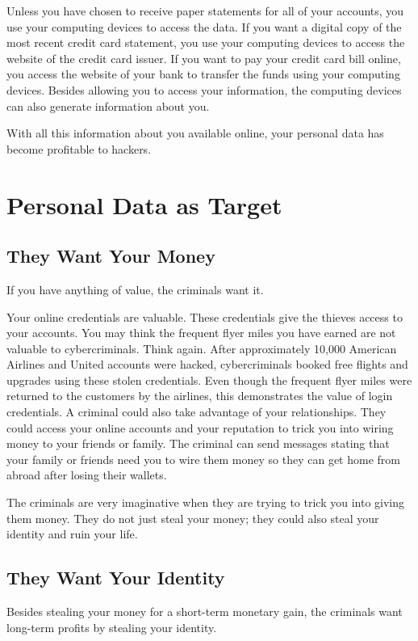 \documentclass{article}
\begin{document}
Unless you have chosen to receive paper statements for all of your accounts, you use your computing devices to access the data. If you want a digital copy of the most recent credit card statement, you use your computing devices to access the website of the credit card issuer. If you want to pay your credit card bill online, you access the website of your bank to transfer the funds using your computing devices. Besides allowing you to access your information, the computing devices can also generate information about you.

With all this information about you available online, your personal data has become profitable to hackers.
\section{Personal Data as Target}
\subsection{They Want Your Money}



If you have anything of value, the criminals want it.

Your online credentials are valuable. These credentials give the thieves access to your accounts. You may think the frequent flyer miles you have earned are not valuable to cybercriminals. Think again. After approximately 10,000 American Airlines and United accounts were hacked, cybercriminals booked free flights and upgrades using these stolen credentials. Even though the frequent flyer miles were returned to the customers by the airlines, this demonstrates the value of login credentials. A criminal could also take advantage of your relationships. They could access your online accounts and your reputation to trick you into wiring money to your friends or family. The criminal can send messages stating that your family or friends need you to wire them money so they can get home from abroad after losing their wallets.

The criminals are very imaginative when they are trying to trick you into giving them money. They do not just steal your money; they could also steal your identity and ruin your life.
\subsection{They Want Your Identity}


Besides stealing your money for a short-term monetary gain, the criminals want long-term profits by stealing your identity.
\end{document}
